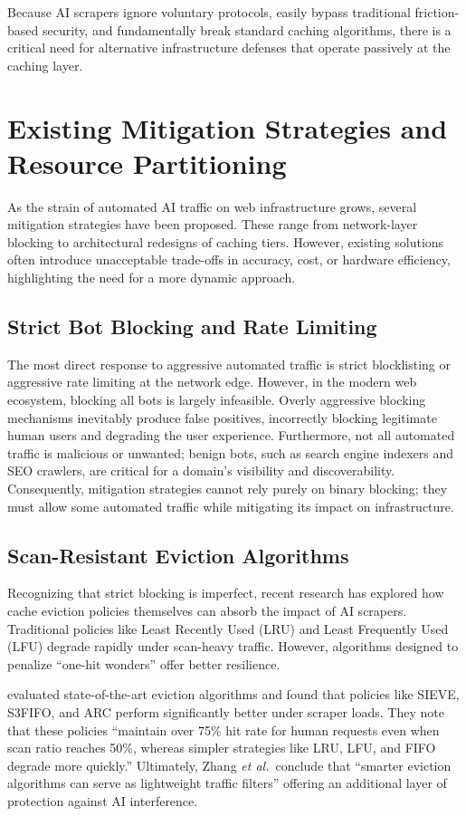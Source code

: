 Because AI scrapers ignore voluntary protocols, easily bypass traditional friction-based security, and fundamentally break standard caching algorithms, there is a critical need for alternative infrastructure defenses that operate passively at the caching layer.

\section{Existing Mitigation Strategies and Resource Partitioning}
As the strain of automated AI traffic on web infrastructure grows, several mitigation strategies have been proposed. These range from network-layer blocking to architectural redesigns of caching tiers. However, existing solutions often introduce unacceptable trade-offs in accuracy, cost, or hardware efficiency, highlighting the need for a more dynamic approach.

\subsection{Strict Bot Blocking and Rate Limiting}
The most direct response to aggressive automated traffic is strict blocklisting or aggressive rate limiting at the network edge. However, in the modern web ecosystem, blocking all bots is largely infeasible. Overly aggressive blocking mechanisms inevitably produce false positives, incorrectly blocking legitimate human users and degrading the user experience. Furthermore, not all automated traffic is malicious or unwanted; benign bots, such as search engine indexers and SEO crawlers, are critical for a domain's visibility and discoverability. Consequently, mitigation strategies cannot rely purely on binary blocking; they must allow some automated traffic while mitigating its impact on infrastructure.

\subsection{Scan-Resistant Eviction Algorithms}
Recognizing that strict blocking is imperfect, recent research has explored how cache eviction policies themselves can absorb the impact of AI scrapers. Traditional policies like Least Recently Used (LRU) and Least Frequently Used (LFU) degrade rapidly under scan-heavy traffic. However, algorithms designed to penalize ``one-hit wonders'' offer better resilience.

 evaluated state-of-the-art eviction algorithms and found that policies like SIEVE, S3FIFO, and ARC perform significantly better under scraper loads. They note that these policies ``maintain over 75\% hit rate for human requests even when scan ratio reaches 50\%, whereas simpler strategies like LRU, LFU, and FIFO degrade more quickly.'' Ultimately, Zhang \textit{et al.}\ conclude that ``smarter eviction algorithms can serve as lightweight traffic filters'' offering an additional layer of protection against AI interference.

